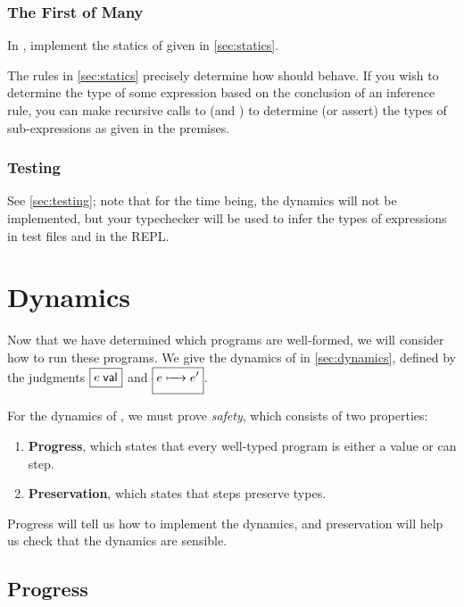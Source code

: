 \documentclass[11pt]{article}
\begin{document}
\subsubsection{The First of Many}

\begin{task}{40}
  In , implement the statics of \LangPSF{} given in \cref{sec:statics}.
\end{task}

\begin{hint}
  The rules in \cref{sec:statics} precisely determine how  should behave.
  If you wish to determine the type of some expression based on the conclusion of an inference rule, you can make recursive calls to  (and ) to determine (or assert) the types of sub-expressions as given in the premises.
\end{hint}


\subsubsection{Testing}
See \cref{sec:testing}; note that for the time being, the dynamics will not be implemented, but your typechecker will be used to infer the types of expressions in test files and in the REPL.


\section{Dynamics}

Now that we have determined which programs are well-formed, we will consider how to run these programs.
We give the dynamics of \LangPSF{} in \cref{sec:dynamics}, defined by the judgments $\boxed{{e}\;{\textsf{val}_{}}}$ and $\boxed{e \xmapsto[\,\,]{\hspace*{1em}} e'}$.

For the dynamics of \LangPSF{}, we must prove \emph{safety}, which consists of two properties:
\begin{enumerate}
  \item \textbf{Progress}, which states that every well-typed program is either a value or can step.
  \item \textbf{Preservation}, which states that steps preserve types.
\end{enumerate}
Progress will tell us how to implement the dynamics, and preservation will help us check that the dynamics are sensible.

\subsection{Progress}
\end{document}
